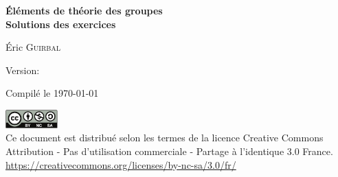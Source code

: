 
\thispagestyle{empty}
\null
\vfill
\begin{center}
  \small 

  \textbf{%
    Éléments de théorie des groupes \\ 
    Solutions des exercices
  }
  \medskip

  Éric \textsc{Guirbal}
  
  \medskip

  Version: \OPTversion

  Compilé le \today
  
  \vfill

  \includegraphics[width=2cm]{images/cc-by-nc-sa} \\ [0.15cm]

  Ce document est distribué selon les termes de la licence Creative Commons
  Attribution - Pas d'utilisation commerciale - Partage à l'identique 3.0
  France. \\
  \url{https://creativecommons.org/licenses/by-nc-sa/3.0/fr/}
\end{center}
